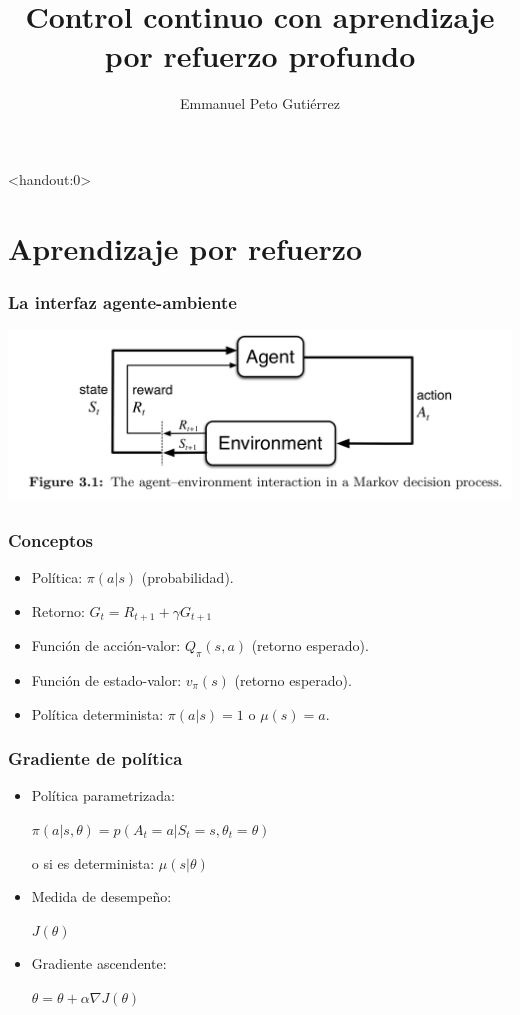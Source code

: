 \documentclass[
    11pt,
    aspectratio=169,
]{beamer}
\title{Control continuo con aprendizaje por refuerzo profundo}
\author{Emmanuel Peto Gutiérrez}
\institute{IIMAS \\ UNAM}
\begin{document}
\begin{frame}<handout:0>
\titlepage
\end{frame}

\section{Aprendizaje por refuerzo}

\begin{frame}
\frametitle{La interfaz agente-ambiente}

\begin{center}
\includegraphics[scale=0.26]{Images/env_agent}
\end{center}

\end{frame}

\begin{frame}
\frametitle{Conceptos}

\begin{itemize}
\item Política: $\pi (a|s)$ (probabilidad).
\item Retorno: $G_t = R_{t+1} + \gamma G_{t+1}$
\item Función de acción-valor: $Q_{\pi}(s,a)$ (retorno esperado).
\item Función de estado-valor: $v_{\pi}(s)$ (retorno esperado).
\item Política determinista: $\pi(a|s) = 1$ o $\mu(s) = a$.
\end{itemize}

\end{frame}

\begin{frame}
\frametitle{Gradiente de política}

\begin{itemize}

\item Política parametrizada:

$\pi (a | s, \theta) = p(A_t = a | S_t=s, \theta_t = \theta)$

o si es determinista: $\mu (s | \theta)$

\item Medida de desempeño:

$J(\theta)$

\item Gradiente ascendente:

$\theta = \theta + \alpha \nabla J(\theta)$

\end{itemize}

\end{frame}
\end{document}
